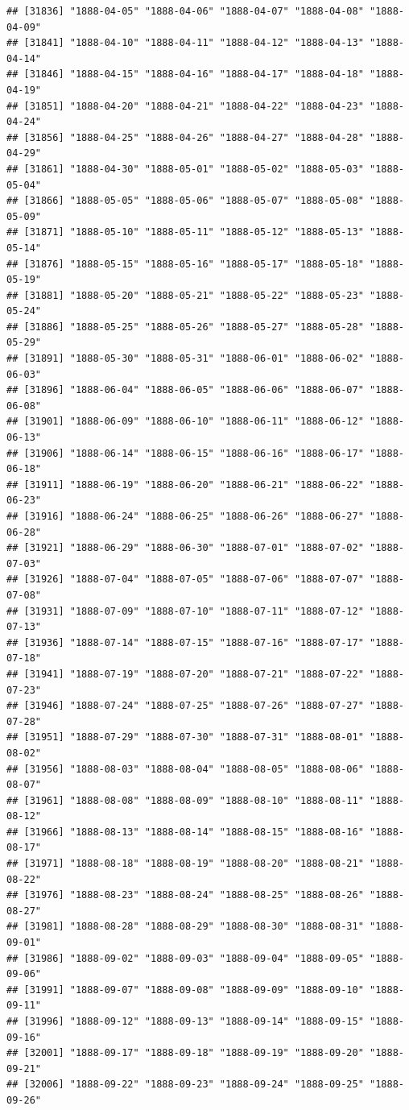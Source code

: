 \documentclass{article}\usepackage[]{graphicx}\usepackage[]{color}
\makeatletter
\newenvironment{kframe}{%
 \def\at@end@of@kframe{}%
 \ifinner\ifhmode%
  \def\at@end@of@kframe{\end{minipage}}%
  \begin{minipage}{\columnwidth}%
 \fi\fi%
 \def\FrameCommand##1{\hskip\@totalleftmargin \hskip-\fboxsep
 \colorbox{shadecolor}{##1}\hskip-\fboxsep
     \hskip-\linewidth \hskip-\@totalleftmargin \hskip\columnwidth}%
 \MakeFramed {\advance\hsize-\width
   \@totalleftmargin\z@ \linewidth\hsize
   \@setminipage}}%
 {\par\unskip\endMakeFramed%
 \at@end@of@kframe}
\newenvironment{knitrout}{}{} %
\makeatother
\begin{document}
\begin{description}
\begin{knitrout}
\begin{kframe}
\begin{verbatim}
## [31836] "1888-04-05" "1888-04-06" "1888-04-07" "1888-04-08" "1888-04-09"
## [31841] "1888-04-10" "1888-04-11" "1888-04-12" "1888-04-13" "1888-04-14"
## [31846] "1888-04-15" "1888-04-16" "1888-04-17" "1888-04-18" "1888-04-19"
## [31851] "1888-04-20" "1888-04-21" "1888-04-22" "1888-04-23" "1888-04-24"
## [31856] "1888-04-25" "1888-04-26" "1888-04-27" "1888-04-28" "1888-04-29"
## [31861] "1888-04-30" "1888-05-01" "1888-05-02" "1888-05-03" "1888-05-04"
## [31866] "1888-05-05" "1888-05-06" "1888-05-07" "1888-05-08" "1888-05-09"
## [31871] "1888-05-10" "1888-05-11" "1888-05-12" "1888-05-13" "1888-05-14"
## [31876] "1888-05-15" "1888-05-16" "1888-05-17" "1888-05-18" "1888-05-19"
## [31881] "1888-05-20" "1888-05-21" "1888-05-22" "1888-05-23" "1888-05-24"
## [31886] "1888-05-25" "1888-05-26" "1888-05-27" "1888-05-28" "1888-05-29"
## [31891] "1888-05-30" "1888-05-31" "1888-06-01" "1888-06-02" "1888-06-03"
## [31896] "1888-06-04" "1888-06-05" "1888-06-06" "1888-06-07" "1888-06-08"
## [31901] "1888-06-09" "1888-06-10" "1888-06-11" "1888-06-12" "1888-06-13"
## [31906] "1888-06-14" "1888-06-15" "1888-06-16" "1888-06-17" "1888-06-18"
## [31911] "1888-06-19" "1888-06-20" "1888-06-21" "1888-06-22" "1888-06-23"
## [31916] "1888-06-24" "1888-06-25" "1888-06-26" "1888-06-27" "1888-06-28"
## [31921] "1888-06-29" "1888-06-30" "1888-07-01" "1888-07-02" "1888-07-03"
## [31926] "1888-07-04" "1888-07-05" "1888-07-06" "1888-07-07" "1888-07-08"
## [31931] "1888-07-09" "1888-07-10" "1888-07-11" "1888-07-12" "1888-07-13"
## [31936] "1888-07-14" "1888-07-15" "1888-07-16" "1888-07-17" "1888-07-18"
## [31941] "1888-07-19" "1888-07-20" "1888-07-21" "1888-07-22" "1888-07-23"
## [31946] "1888-07-24" "1888-07-25" "1888-07-26" "1888-07-27" "1888-07-28"
## [31951] "1888-07-29" "1888-07-30" "1888-07-31" "1888-08-01" "1888-08-02"
## [31956] "1888-08-03" "1888-08-04" "1888-08-05" "1888-08-06" "1888-08-07"
## [31961] "1888-08-08" "1888-08-09" "1888-08-10" "1888-08-11" "1888-08-12"
## [31966] "1888-08-13" "1888-08-14" "1888-08-15" "1888-08-16" "1888-08-17"
## [31971] "1888-08-18" "1888-08-19" "1888-08-20" "1888-08-21" "1888-08-22"
## [31976] "1888-08-23" "1888-08-24" "1888-08-25" "1888-08-26" "1888-08-27"
## [31981] "1888-08-28" "1888-08-29" "1888-08-30" "1888-08-31" "1888-09-01"
## [31986] "1888-09-02" "1888-09-03" "1888-09-04" "1888-09-05" "1888-09-06"
## [31991] "1888-09-07" "1888-09-08" "1888-09-09" "1888-09-10" "1888-09-11"
## [31996] "1888-09-12" "1888-09-13" "1888-09-14" "1888-09-15" "1888-09-16"
## [32001] "1888-09-17" "1888-09-18" "1888-09-19" "1888-09-20" "1888-09-21"
## [32006] "1888-09-22" "1888-09-23" "1888-09-24" "1888-09-25" "1888-09-26"

\end{verbatim}
\end{kframe}
\end{knitrout}
\end{description}
\end{document}
